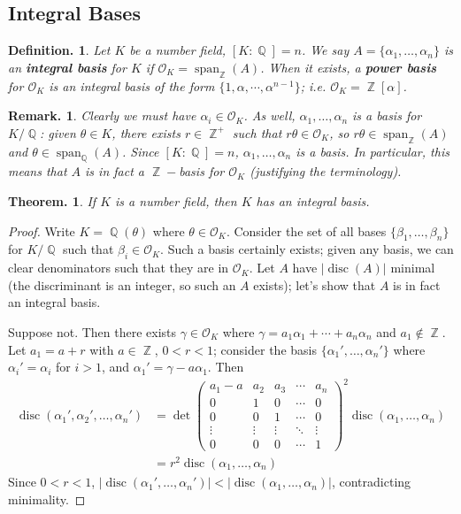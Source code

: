 \documentclass[11pt, a4paper]{memoir}
\DeclareMathOperator{\Q}{{\mathbb{Q}}}
\DeclareMathOperator{\Z}{{\mathbb{Z}}}
\theoremstyle{change}
\newtheorem{theorem}{Theorem.}[section]
\theoremstyle{plain}
\theoremstyle{nonumberplain}
\newtheorem{definition}{Definition.}
\newtheorem{remark}{Remark.}
\newtheorem{proof}{Proof}
\DeclareMathOperator{\disc}{disc}
\DeclareMathOperator{\spn}{span}
\numberwithin{equation}{section}
\begin{document}
\subsection{Integral Bases}
\begin{definition}
    Let $K$ be a number field, $[K:\Q]=n$.
    We say $A=\{\alpha_1,\ldots,\alpha_n\}$ is an \textbf{integral basis} for $K$ if $\mathcal{O}_K=\spn_{\Z}(A)$.
    When it exists, a \textbf{power basis} for $\mathcal{O}_K$ is an integral basis of the form $\{1,\alpha,\cdots,\alpha^{n-1}\}$; i.e. $\mathcal{O}_K=\Z[\alpha]$.
\end{definition}
\begin{remark}
    Clearly we must have $\alpha_i\in\mathcal{O}_K$.
    As well, $\alpha_1,\ldots,\alpha_n$ is a basis for $K/\Q$: given $\theta\in K$, there exists $r\in\Z^+$ such that $r\theta\in\mathcal{O}_K$, so $r\theta\in\spn_{\Z}(A)$ and $\theta\in\spn_{\Q}(A)$.
    Since $[K:\Q]=n$, $\alpha_1,\ldots,\alpha_n$ is a basis.
    In particular, this means that $A$ is in fact a $\Z-$basis for $\mathcal{O}_K$ (justifying the terminology).
\end{remark}
\begin{theorem}
    If $K$ is a number field, then $K$ has an integral basis.
\end{theorem}
\begin{proof}
    Write $K=\Q(\theta)$ where $\theta\in\mathcal{O}_K$.
    Consider the set of all bases $\{\beta_1,\ldots,\beta_n\}$ for $K/\Q$ such that $\beta_i\in\mathcal{O}_K$.
    Such a basis certainly exists; given any basis, we can clear denominators such that they are in $\mathcal{O}_K$.
    Let $A$ have $|\disc(A)|$ minimal (the discriminant is an integer, so such an $A$ exists); let's show that $A$ is in fact an integral basis.

    Suppose not.
    Then there exists $\gamma\in\mathcal{O}_K$ where $\gamma=a_1\alpha_1+\cdots+a_n\alpha_n$ and $a_1\notin\Z$.
    Let $a_1=a+r$ with $a\in\Z$, $0<r<1$; consider the basis $\{\alpha_1',\ldots,\alpha_n'\}$ where $\alpha_i'=\alpha_i$ for $i>1$, and $\alpha_1'=\gamma-a\alpha_1$.
    Then
    \begin{align*}
        \disc(\alpha_1',\alpha_2',\ldots,\alpha_n') &= \det
        \begin{pmatrix}
            a_1-a&a_2&a_3&\cdots&a_n\\
            0&1&0&\cdots&0\\
            0&0&1&\cdots&0\\
            \vdots&\vdots&\vdots&\ddots&\vdots\\
            0&0&0&\cdots&1
        \end{pmatrix}^2\disc(\alpha_1,\ldots,\alpha_n)\\
        &= r^2\disc(\alpha_1,\ldots,\alpha_n)
    \end{align*}
    Since $0<r<1$, $|\disc(\alpha_1',\ldots,\alpha_n')|<|\disc(\alpha_1,\ldots,\alpha_n)|$, contradicting minimality.
\end{proof}
\end{document}
